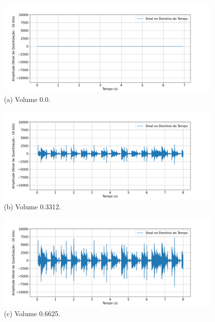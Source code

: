 \begin{figure}[htpb]
    \centering
    \begin{minipage}[b]{0.7\textwidth}
        \centering
        \includegraphics[width=\textwidth]{figuras/fig66.png}
        \vspace{0.3cm} %
        (a) Volume 0.0.
    \end{minipage}
    \hspace{0.5cm} %

    \begin{minipage}[b]{0.7\textwidth}
        \centering
        \includegraphics[width=\textwidth]{figuras/fig67.png}
        \vspace{0.3cm} %
        (b) Volume 0.3312.
    \end{minipage}
    
    \vspace{0.5cm} %

    \begin{minipage}[b]{0.7\textwidth}
        \centering
        \includegraphics[width=\textwidth]{figuras/fig68.png}
        \vspace{0.3cm} %
        (c) Volume 0.6625.
    \end{minipage}
    \hspace{0.5cm} %


\end{figure}
